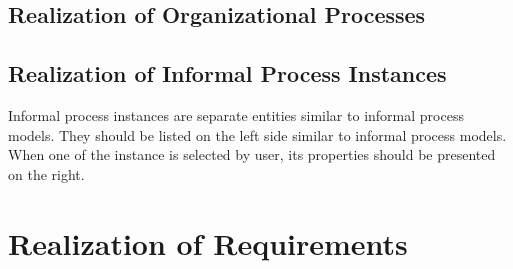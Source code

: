 \subsection{Realization of Organizational Processes}


\subsection{Realization of Informal Process Instances}
Informal process instances are separate entities similar to informal process models. They should be listed on the left side similar to informal process models. When one of the instance is selected by user, its properties should be presented on the right.





\section{Realization of Requirements}
\label{sec:realizationofrequirements}
